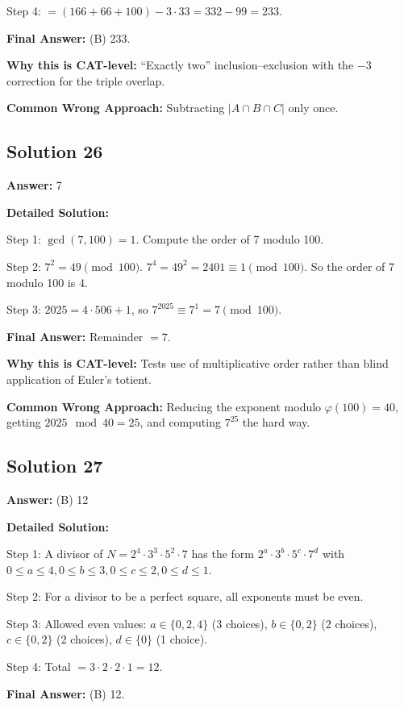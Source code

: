 \documentclass[11pt]{article}
\begin{document}
Step 4: $= (166 + 66 + 100) - 3 \cdot 33 = 332 - 99 = 233$.

\textbf{Final Answer:} (B) 233.

\textbf{Why this is CAT-level:} ``Exactly two'' inclusion--exclusion with the $-3$ correction for the triple overlap.

\textbf{Common Wrong Approach:} Subtracting $|A\cap B \cap C|$ only once.

\subsection*{Solution 26}
\textbf{Answer:} 7

\textbf{Detailed Solution:}

Step 1: $\gcd(7, 100) = 1$. Compute the order of 7 modulo 100.

Step 2: $7^2 = 49 \pmod{100}$. $7^4 = 49^2 = 2401 \equiv 1 \pmod{100}$. So the order of 7 modulo 100 is 4.

Step 3: $2025 = 4 \cdot 506 + 1$, so $7^{2025} \equiv 7^1 = 7 \pmod{100}$.

\textbf{Final Answer:} Remainder $= 7$.

\textbf{Why this is CAT-level:} Tests use of multiplicative order rather than blind application of Euler's totient.

\textbf{Common Wrong Approach:} Reducing the exponent modulo $\varphi(100) = 40$, getting $2025 \mod 40 = 25$, and computing $7^{25}$ the hard way.

\subsection*{Solution 27}
\textbf{Answer:} (B) 12

\textbf{Detailed Solution:}

Step 1: A divisor of $N = 2^4 \cdot 3^3 \cdot 5^2 \cdot 7$ has the form $2^a \cdot 3^b \cdot 5^c \cdot 7^d$ with $0 \le a \le 4, 0 \le b \le 3, 0 \le c \le 2, 0 \le d \le 1$.

Step 2: For a divisor to be a perfect square, all exponents must be even.

Step 3: Allowed even values: $a \in \{0, 2, 4\}$ (3 choices), $b \in \{0, 2\}$ (2 choices), $c \in \{0, 2\}$ (2 choices), $d \in \{0\}$ (1 choice).

Step 4: Total $= 3 \cdot 2 \cdot 2 \cdot 1 = 12$.

\textbf{Final Answer:} (B) 12.
\end{document}

